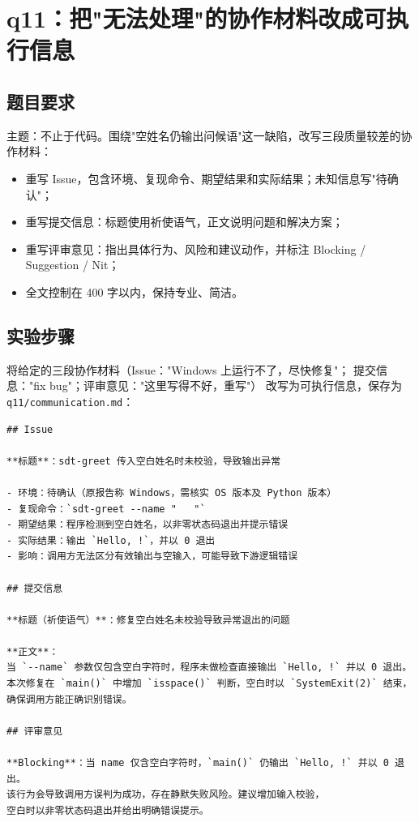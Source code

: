 \documentclass[a4paper,11pt]{ctexart}
\begin{document}
\section{q11：把"无法处理"的协作材料改成可执行信息}

\subsection{题目要求}

主题：不止于代码。围绕"空姓名仍输出问候语"这一缺陷，改写三段质量较差的协作材料：
\begin{itemize}
  \item 重写 Issue，包含环境、复现命令、期望结果和实际结果；未知信息写"待确认"；
  \item 重写提交信息：标题使用祈使语气，正文说明问题和解决方案；
  \item 重写评审意见：指出具体行为、风险和建议动作，并标注 Blocking / Suggestion / Nit；
  \item 全文控制在 400 字以内，保持专业、简洁。
\end{itemize}

\subsection{实验步骤}

将给定的三段协作材料（Issue："Windows 上运行不了，尽快修复"；
提交信息："fix bug"；评审意见："这里写得不好，重写"）
改写为可执行信息，保存为 \texttt{q11/communication.md}：

\begin{lstlisting}
## Issue

**标题**：sdt-greet 传入空白姓名时未校验，导致输出异常

- 环境：待确认（原报告称 Windows，需核实 OS 版本及 Python 版本）
- 复现命令：`sdt-greet --name "   "`
- 期望结果：程序检测到空白姓名，以非零状态码退出并提示错误
- 实际结果：输出 `Hello, !`，并以 0 退出
- 影响：调用方无法区分有效输出与空输入，可能导致下游逻辑错误

## 提交信息

**标题（祈使语气）**：修复空白姓名未校验导致异常退出的问题

**正文**：
当 `--name` 参数仅包含空白字符时，程序未做检查直接输出 `Hello, !` 并以 0 退出。
本次修复在 `main()` 中增加 `isspace()` 判断，空白时以 `SystemExit(2)` 结束，
确保调用方能正确识别错误。

## 评审意见

**Blocking**：当 name 仅含空白字符时，`main()` 仍输出 `Hello, !` 并以 0 退出。
该行为会导致调用方误判为成功，存在静默失败风险。建议增加输入校验，
空白时以非零状态码退出并给出明确错误提示。
\end{lstlisting}
\end{document}
